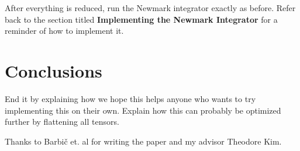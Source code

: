 \documentclass[twocolumn,10pt]{asme2ej}
\begin{document}
After everything is reduced, run the Newmark integrator exactly as before. Refer back to the section titled \textbf{Implementing the Newmark Integrator} for a reminder of how to implement it.

\section{Conclusions}

End it by explaining how we hope this helps anyone who wants to try implementing this on their own.
Explain how this can probably be optimized further by flattening all tensors.

\begin{acknowledgment}

Thanks to Barbič et. al for writing the paper and my advisor Theodore Kim.

\end{acknowledgment}






%
\end{document}
